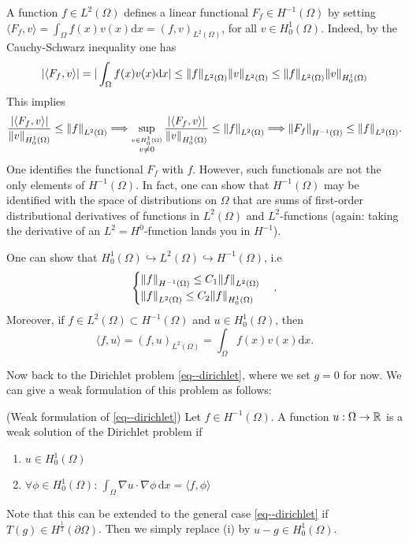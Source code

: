 \documentclass[11pt]{article}
\begin{document}
			A function $f\in L^2(\Omega)$ defines a linear functional $F_f\in H^{-1}(\Omega)$ by setting $\langle F_f,v\rangle =\int_\Omega f(x)v(x)\mathrm{d}x=(f,v)_{L^2(\Omega)}$, for all $v\in H^1_0(\Omega)$. Indeed, by the Cauchy-Schwarz inequality one has
			\begin{equation*}
				|\langle F_f,v\rangle|=|\int_{\Omega}f(x)v(x)\mathrm{d}x|\le\norm{f}_{L^2(\Omega)}\norm{v}_{L^2(\Omega)}\le\norm{f}_{L^2(\Omega)}\norm{v}_{H^1_0(\Omega)}
			\end{equation*}
			This implies
			\begin{equation*}
				\frac{|\langle F_f,v\rangle|}{\norm{v}_{H^1_0(\Omega)}}\le\norm{f}_{L^2(\Omega)}\Longrightarrow\sup_{\stackrel{v\in H^1_0(\Omega)}{v\neq0}}\frac{|\langle F_f,v\rangle|}{\norm{v}_{H^1_0(\Omega)}}\le\norm{f}_{L^2(\Omega)}\Longrightarrow\norm{F_f}_{H^{-1}(\Omega)}\le\norm{f}_{L^2(\Omega)}.
			\end{equation*}
			One identifies the functional $F_f$ with $f$. However, such functionals are not the only elements of $H^{-1}(\Omega)$. In fact, one can show that $H^{-1}(\Omega)$ may be identified with the space of distributions on $\Omega$ that are sums of first-order distributional derivatives of functions in $L^2(\Omega)$ and $L^2$-functions (again: taking the derivative of an $L^2=H^0$-function lands you in $H^{-1}$).
			
			\begin{remark}
				One can show that $H^1_0(\Omega)\hookrightarrow L^2(\Omega)\hookrightarrow H^{-1}(\Omega)$, i.e
				\begin{equation*}
					\begin{cases}
						\norm{f}_{H^{-1}(\Omega)}\le C_1\norm{f}_{L^2(\Omega)}\\
						\norm{f}_{L^2(\Omega)}\le C_2\norm{f}_{H^1_0(\Omega)}
					\end{cases}.
				\end{equation*}
				Moreover, if $f\in L^2(\Omega)\subset H^{-1}(\Omega)$ and $u\in H^1_0(\Omega)$, then
				\begin{equation*}
					\langle f,u\rangle=(f,u)_{L^2(\Omega)}=\int_{\Omega}f(x)v(x)\mathrm{d}x.
				\end{equation*}
			\end{remark}

			Now back to the Dirichlet problem \eqref{eq--dirichlet}, where we set $g=0$ for now. We can give a weak formulation of this problem as follows:

			\begin{defi}
				(Weak formulation of \eqref{eq--dirichlet}) Let $f\in H^{-1}(\Omega)$. A function $u:\Omega\rightarrow\mathbb{R}$ is a weak solution of the Dirichlet problem if
				\begin{enumerate}
					\item $u\in H^1_0(\Omega)$
					\item $\forall\phi\in H^1_0(\Omega)$: $\int_\Omega\nabla u\cdot\nabla\phi \,\mathrm{d}x=\langle f,\phi\rangle$
				\end{enumerate} 
				Note that this can be extended to the general case \eqref{eq--dirichlet} if $T(g)\in H^{\frac{1}{2}}(\partial\Omega)$. Then we simply replace (i) by $u-g\in H^1_0(\Omega)$.
			\end{defi}
\end{document}
